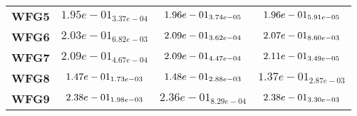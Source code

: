 \documentclass{article}
\begin{document}
\begin{table}[!htp]
\begin{scriptsize}
\begin{tabular}{c|ccc}
      \textbf{WFG5} & $1.95e-01_{3.37e-04} $ & $ \cellcolor{gray95} 1.96e-01_{3.74e-05} $ & $ \cellcolor{gray25} 1.96e-01_{5.91e-05}$ \\
      \textbf{WFG6} & $2.03e-01_{6.82e-03} $ & $ \cellcolor{gray95} 2.09e-01_{3.62e-04} $ & $ \cellcolor{gray25} 2.07e-01_{8.60e-03}$ \\
      \textbf{WFG7} & $2.09e-01_{4.67e-04} $ & $ \cellcolor{gray25} 2.09e-01_{4.47e-04} $ & $ \cellcolor{gray95} 2.11e-01_{3.49e-05}$ \\
      \textbf{WFG8} & $\cellcolor{gray25} 1.47e-01_{1.73e-03} $ & $ \cellcolor{gray95} 1.48e-01_{2.88e-03} $ & $ 1.37e-01_{2.87e-03}$ \\
      \textbf{WFG9} & $\cellcolor{gray25} 2.38e-01_{1.98e-03} $ & $ 2.36e-01_{8.29e-04} $ & $ \cellcolor{gray95} 2.38e-01_{3.30e-03}$ \\
  \end{tabular}
  \end{scriptsize}
\end{table}
\end{document}
